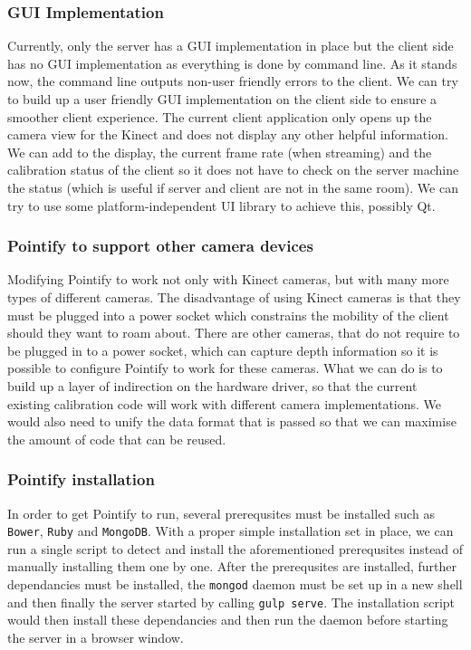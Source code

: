 \documentclass{article}
\begin{document}
\subsubsection{GUI Implementation}
Currently, only the server has a GUI implementation in place but the client side has no GUI implementation as everything is done by command line. As it stands now, the command line outputs non-user friendly errors to the client. We can try to build up a user friendly GUI implementation on the client side to ensure a smoother client experience. The current client application only opens up the camera view for the Kinect and does not display any other helpful information. We can add to the display, the current frame rate (when streaming) and the calibration status of the client so it does not have to check on the server machine the status (which is useful if server and client are not in the same room). We can try to use some platform-independent UI library to achieve this, possibly Qt.
\subsubsection{Pointify to support other camera devices}
Modifying Pointify to work not only with Kinect cameras, but with many more types of different cameras. The disadvantage of using Kinect cameras is that they must be plugged into a power socket which constrains the mobility of the client should they want to roam about. There are other cameras, that do not require to be plugged in to a power socket, which can capture depth information so it is possible to configure Pointify to work for these cameras. What we can do is to build up a layer of indirection on the hardware driver, so that the current existing calibration code will work with different camera implementations. We would also need to unify the data format that is passed so that we can maximise the amount of code that can be reused.
\subsubsection{Pointify installation}
In order to get Pointify to run, several prerequsites must be installed such as \texttt{Bower}, \texttt{Ruby} and \texttt{MongoDB}. With a proper simple installation set in place, we can run a single script to detect and install the aforementioned prerequsites instead of manually installing them one by one. After the prerequsites are installed, further dependancies must be installed, the \texttt{mongod} daemon must be set up in a new shell and then finally the server started by calling \texttt{gulp serve}. The installation script would then install these dependancies and then run the daemon before starting the server in a browser window.
\end{document}
